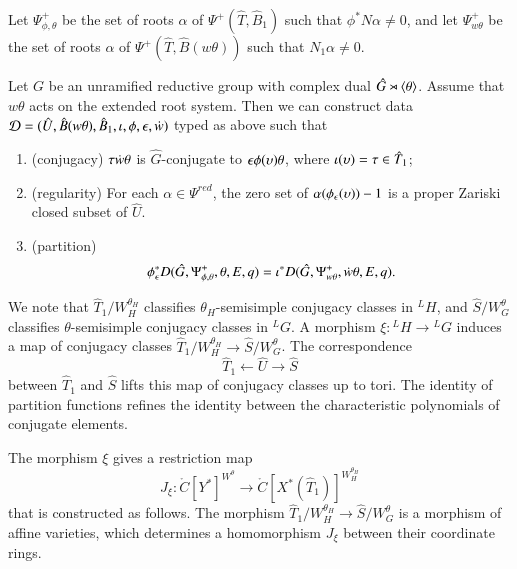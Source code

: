 Let $\Psi_{\phi,\theta}^+$ be the set of roots $\alpha$ of
  $\Psi^+(\hat T,\hat B_1)$ such that $\phi^*N\alpha\ne 0$, and let
  $\Psi_{w\theta}^+$ 
be the set of roots $\alpha$ of $\Psi^+(\hat T,\hat B(w\theta))$ such
  that $N_1\alpha\ne0$.  

\begin{proposition}\label{lemma:ephi}
  Let $G$ be an unramified reductive group with complex dual $\hat
  G\rtimes \langle{\theta}\rangle$.  Assume that $w\theta$ acts on the extended
  root system.  Then we can construct data $\mathcal D=(\hat U,\hat B(w\theta),\hat
  B_1,\iota,\phi,\epsilon,\dot w)$ typed as above such that
\begin{enumerate}
\item (conjugacy) $\tau\dot w\theta$ is $\hat G$-conjugate to
  $\epsilon\phi(\upsilon) \theta$, where $\iota(\upsilon) = \tau\in\hat T_1$;
\item (regularity) For each $\alpha\in\Psi^{red}$, the zero set of
  $\alpha(\phi_\epsilon(\upsilon))-1$ is a proper Zariski closed subset of $\hat U$.
\item (partition) 
\[
\phi^*_\epsilon D(\hat G,\Psi_{\phi,\theta}^+,\theta,E,q) =
\iota^* D(\hat G,\Psi_{w\theta}^+,\dot w\theta,E,q).
\]
\end{enumerate}
\end{proposition}

\begin{remark}
We note that $\hat T_1/W_H^{\theta_H}$ classifies
$\theta_H$-semisimple conjugacy classes in ${}^LH$, and
$\hat S/W_G^{\theta}$ classifies $\theta$-semisimple conjugacy classes
in ${}^LG$.  A morphism $\xi:{}^LH\to {}^LG$ induces a map of conjugacy classes
$\hat T_1/W_H^{\theta_H}\to \hat S/W_G^\theta$.  The 
correspondence
\[
\hat T_1 \longleftarrow \hat U \longrightarrow \hat S
\]
between $\hat T_1$ and $\hat S$ lifts this map of
conjugacy classes up to tori.  The identity of partition functions 
 refines the identity between the characteristic polynomials of
conjugate elements.

The morphism $\xi$ gives a restriction map
\begin{equation}\label{eqn:Jxi}
J_\xi:\ring{C}[Y^*]^{W^\theta} \to \ring{C}[X^*(\hat T_1)]^{W_H^{\theta_H}}
\end{equation}
that is constructed as follows.  
The morphism $\hat T_1/W_H^{\theta_H}\to \hat S/W_G^\theta$
is a morphism of affine varieties, which determines a homomorphism
$J_\xi$ between their coordinate rings.
\end{remark}


